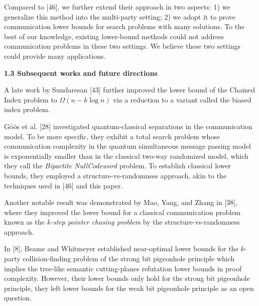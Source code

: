 Compared to [46], we further extend their approach in two aspects: 1) we generalize this method into the multi-party setting; 2) we adopt it to prove communication lower bounds for search problems with many solutions. To the best of our knowledge, existing lower-bound methods could not address communication problems in these two settings. We believe these two settings could provide many applications.\par






\par\medskip\noindent\textbf{
1.3 Subsequent works and future directions}\par




A late work by Sundaresan [43] further improved the lower bound of the Chained Index problem to $\Omega(n-k\log n)$ via a reduction to a variant called the biased index problem.\par




Göös et al. [28] investigated quantum-classical separations in the communication model. To be more specific, they exhibit a total search problem whose communication complexity in the quantum simultaneous message passing model is exponentially smaller than in the classical two-way
randomized model, which they call the \emph{Bipartite NullCodeword} problem. To establish classical lower bounds, they employed a structure-vs-randomness approach, akin to the techniques used in [46] and this paper.\par




Another notable result was demonstrated by Mao, Yang, and Zhang in [38], where they improved the lower bound for a classical communication problem known as the $k$\emph{-step pointer chasing problem} by the structure-vs-randomness approach.\par




In [8], Beame and Whitmeyer established near-optimal lower bounds for the $k$-party collision-finding problem of the strong bit pigeonhole principle which implies the tree-like semantic cutting-planes refutation lower bounds in proof complexity. However, their lower bounds only hold for the strong bit pigeonhole principle, they left lower bounds for the weak bit pigeonhole principle as an open question.\par




